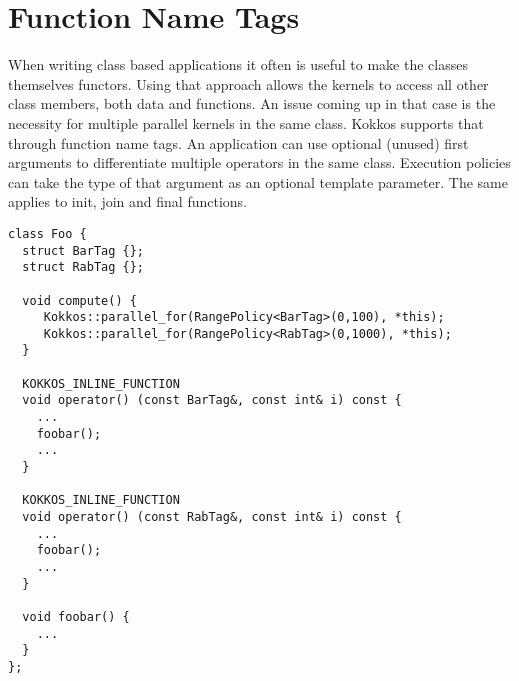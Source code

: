 \section{Function Name Tags}

When writing class based applications it often is useful to make the classes themselves functors.
Using that approach allows the kernels to access all other class members, both data and functions. 
An issue coming up in that case is the necessity for multiple parallel kernels in the same class.
Kokkos supports that through function name tags. An application can use optional (unused) first arguments
to differentiate multiple operators in the same class. Execution policies can take the type of that argument as
an optional template parameter. The same applies to init, join and final functions. 

\begin{lstlisting}
class Foo {
  struct BarTag {};
  struct RabTag {};
  
  void compute() {
     Kokkos::parallel_for(RangePolicy<BarTag>(0,100), *this);
     Kokkos::parallel_for(RangePolicy<RabTag>(0,1000), *this);
  }
  
  KOKKOS_INLINE_FUNCTION
  void operator() (const BarTag&, const int& i) const {
    ...
    foobar();
    ...
  }
  
  KOKKOS_INLINE_FUNCTION
  void operator() (const RabTag&, const int& i) const {
    ...
    foobar();
    ...
  }
  
  void foobar() {
    ...
  }
};
\end{lstlisting}

